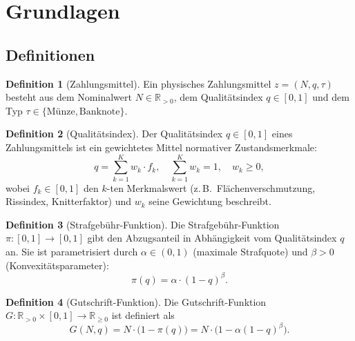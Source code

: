 ﻿\documentclass[a4paper,12pt]{article}
\theoremstyle{definition}
\newtheorem{definition}{Definition}
\begin{document}
\section{Grundlagen}
\label{sec:grundlagen}

\subsection{Definitionen}

\begin{definition}[Zahlungsmittel]
Ein physisches Zahlungsmittel $z = (N, q, \tau)$ besteht aus dem Nominalwert
$N \in \mathbb{R}_{>0}$, dem Qualitätsindex $q \in [0,1]$ und dem Typ
$\tau \in \{\text{Münze}, \text{Banknote}\}$.
\end{definition}

\begin{definition}[Qualitätsindex]
\label{def:qualitaet}
Der Qualitätsindex $q \in [0,1]$ eines Zahlungsmittels ist ein gewichtetes Mittel
normativer Zustandsmerkmale:
\[
q = \sum_{k=1}^{K} w_k \cdot f_k,
\quad
\sum_{k=1}^{K} w_k = 1,\quad w_k \geq 0,
\]
wobei $f_k \in [0,1]$ den $k$-ten Merkmalswert (z.\,B.\ Flächenverschmutzung,
Rissindex, Knitterfaktor) und $w_k$ seine Gewichtung beschreibt.
\end{definition}

\begin{definition}[Strafgebühr-Funktion]
\label{def:strafe}
Die Strafgebühr-Funktion $\pi : [0,1] \to [0,1]$ gibt den Abzugsanteil in
Abhängigkeit vom Qualitätsindex $q$ an.  Sie ist parametrisiert durch
$\alpha \in (0,1)$ (maximale Strafquote) und $\beta > 0$ (Konvexitätsparameter):
\[
\pi(q) = \alpha \cdot (1 - q)^{\beta}.
\]
\end{definition}

\begin{definition}[Gutschrift-Funktion]
\label{def:gutschrift}
Die Gutschrift-Funktion $G : \mathbb{R}_{>0} \times [0,1] \to \mathbb{R}_{\geq 0}$ ist definiert als
\[
G(N, q) = N \cdot \bigl(1 - \pi(q)\bigr) = N \cdot \bigl(1 - \alpha(1-q)^{\beta}\bigr).
\]
\end{definition}
\end{document}
